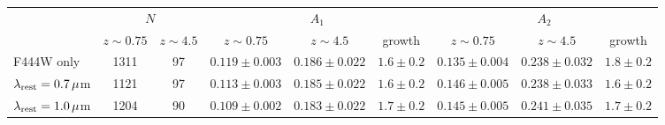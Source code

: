 \begin{tabular}{lcccccccc}
\toprule
 & \multicolumn{2}{c}{$N$} & \multicolumn{3}{c}{$A_1$} & \multicolumn{3}{c}{$A_2$}\\
 & $z\sim0.75$ & $z\sim4.5$ & $z\sim0.75$ & $z\sim4.5$ & growth & $z\sim0.75$ & $z\sim4.5$ & growth\\
\midrule
F444W only & 1311 & 97 & $0.119\pm0.003$ & $0.186\pm0.022$ & $1.6\pm0.2$ & $0.135\pm0.004$ & $0.238\pm0.032$ & $1.8\pm0.2$\\
$\lambda_{\rm rest}=0.7\,\mu$m & 1121 & 97 & $0.113\pm0.003$ & $0.185\pm0.022$ & $1.6\pm0.2$ & $0.146\pm0.005$ & $0.238\pm0.033$ & $1.6\pm0.2$\\
$\lambda_{\rm rest}=1.0\,\mu$m & 1204 & 90 & $0.109\pm0.002$ & $0.183\pm0.022$ & $1.7\pm0.2$ & $0.145\pm0.005$ & $0.241\pm0.035$ & $1.7\pm0.2$\\
\bottomrule
\end{tabular}
